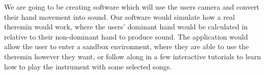 We are going to be creating software which will use the users camera and convert their hand movement into sound. Our software would simulate how a real theremin would work, where the users' dominant hand would be calculated in relative to their non-dominant hand to produce sound. The application would allow the user to enter a sandbox environment, where they are able to use the theremin however they want, or follow along in a few interactive tutorials to learn how to play the instrument with some selected songs.